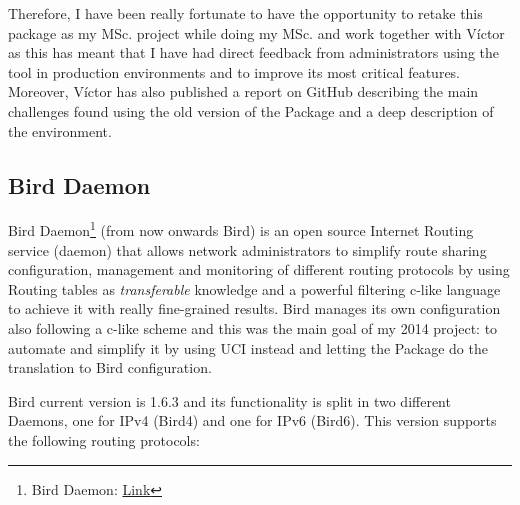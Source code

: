 Therefore, I have been really fortunate to have the opportunity to retake this package as my MSc. project while doing my MSc. and work together with Víctor as this has meant that I have had direct feedback from administrators using the tool in production environments and to improve its most critical features. Moreover, Víctor has also published a report on GitHub \cite{bgpbmx6} describing the main challenges found using the old version of the Package and a deep description of the environment.

\subsection{Bird Daemon}
Bird Daemon\footnote{Bird Daemon: \href{http://bird.network.cz/}{Link}} (from now onwards Bird) is an open source Internet Routing service (daemon) that allows network administrators to simplify route sharing configuration, management and monitoring of different routing protocols by using Routing tables as \textit{transferable} knowledge and a powerful filtering c-like language to achieve it with really fine-grained results. Bird manages its own configuration also following a c-like scheme and this was the main goal of my 2014 project: to automate and simplify it by using UCI instead and letting the Package do the translation to Bird configuration.

Bird current version is 1.6.3 and its functionality is split in two different Daemons, one for IPv4 (Bird4) and one for IPv6 (Bird6). This version supports the following routing protocols:

